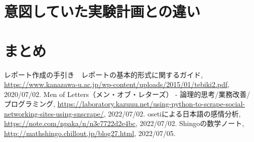 \documentclass[a4paper, 11pt, titlepage]{jsarticle}
\begin{document}
\section{意図していた実験計画との違い}


\section{まとめ}


\begin{thebibliography}{n}
  レポート作成の手引き　レポートの基本的形式に関するガイド, \url{https://www.kanazawa-u.ac.jp/wp-content/uploads/2015/01/tebiki2.pdf}, 2020/07/02.
   Men of Letters（メン・オブ・レターズ） - 論理的思考/業務改善/プログラミング, \url{https://laboratory.kazuuu.net/using-python-to-scrape-social-networking-sites-using-snscrape/}, 2022/07/02.
    osetiによる日本語の感情分析, \url{https://note.com/npaka/n/n3c7722d2e4bc}, 2022/07/02.
Shingoの数学ノート, \url{http://mathshingo.chillout.jp/blog27.html}, 2022/07/05.
      

\end{thebibliography}
\end{document}
